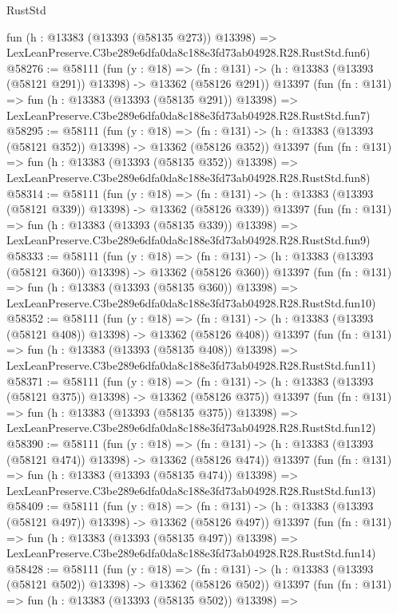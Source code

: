 \begin{lexlean}{RustStd}
\begin{coremodule}
    fun (h : @13383 (@13393 (@58135 @273)) @13398) =>
    LexLeanPreserve.C3be289e6dfa0da8c188e3fd73ab04928.R28.RustStd.fun6)
@58276 := @58111
    (fun (y : @18) =>
    (fn : @131) -> (h : @13383 (@13393 (@58121 @291)) @13398) -> @13362 (@58126 @291))
    @13397
    (fun (fn : @131) =>
    fun (h : @13383 (@13393 (@58135 @291)) @13398) =>
    LexLeanPreserve.C3be289e6dfa0da8c188e3fd73ab04928.R28.RustStd.fun7)
@58295 := @58111
    (fun (y : @18) =>
    (fn : @131) -> (h : @13383 (@13393 (@58121 @352)) @13398) -> @13362 (@58126 @352))
    @13397
    (fun (fn : @131) =>
    fun (h : @13383 (@13393 (@58135 @352)) @13398) =>
    LexLeanPreserve.C3be289e6dfa0da8c188e3fd73ab04928.R28.RustStd.fun8)
@58314 := @58111
    (fun (y : @18) =>
    (fn : @131) -> (h : @13383 (@13393 (@58121 @339)) @13398) -> @13362 (@58126 @339))
    @13397
    (fun (fn : @131) =>
    fun (h : @13383 (@13393 (@58135 @339)) @13398) =>
    LexLeanPreserve.C3be289e6dfa0da8c188e3fd73ab04928.R28.RustStd.fun9)
@58333 := @58111
    (fun (y : @18) =>
    (fn : @131) -> (h : @13383 (@13393 (@58121 @360)) @13398) -> @13362 (@58126 @360))
    @13397
    (fun (fn : @131) =>
    fun (h : @13383 (@13393 (@58135 @360)) @13398) =>
    LexLeanPreserve.C3be289e6dfa0da8c188e3fd73ab04928.R28.RustStd.fun10)
@58352 := @58111
    (fun (y : @18) =>
    (fn : @131) -> (h : @13383 (@13393 (@58121 @408)) @13398) -> @13362 (@58126 @408))
    @13397
    (fun (fn : @131) =>
    fun (h : @13383 (@13393 (@58135 @408)) @13398) =>
    LexLeanPreserve.C3be289e6dfa0da8c188e3fd73ab04928.R28.RustStd.fun11)
@58371 := @58111
    (fun (y : @18) =>
    (fn : @131) -> (h : @13383 (@13393 (@58121 @375)) @13398) -> @13362 (@58126 @375))
    @13397
    (fun (fn : @131) =>
    fun (h : @13383 (@13393 (@58135 @375)) @13398) =>
    LexLeanPreserve.C3be289e6dfa0da8c188e3fd73ab04928.R28.RustStd.fun12)
@58390 := @58111
    (fun (y : @18) =>
    (fn : @131) -> (h : @13383 (@13393 (@58121 @474)) @13398) -> @13362 (@58126 @474))
    @13397
    (fun (fn : @131) =>
    fun (h : @13383 (@13393 (@58135 @474)) @13398) =>
    LexLeanPreserve.C3be289e6dfa0da8c188e3fd73ab04928.R28.RustStd.fun13)
@58409 := @58111
    (fun (y : @18) =>
    (fn : @131) -> (h : @13383 (@13393 (@58121 @497)) @13398) -> @13362 (@58126 @497))
    @13397
    (fun (fn : @131) =>
    fun (h : @13383 (@13393 (@58135 @497)) @13398) =>
    LexLeanPreserve.C3be289e6dfa0da8c188e3fd73ab04928.R28.RustStd.fun14)
@58428 := @58111
    (fun (y : @18) =>
    (fn : @131) -> (h : @13383 (@13393 (@58121 @502)) @13398) -> @13362 (@58126 @502))
    @13397
    (fun (fn : @131) =>
    fun (h : @13383 (@13393 (@58135 @502)) @13398) =>

\end{coremodule}
\end{lexlean}
